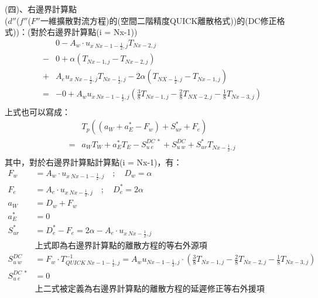 \documentclass[12pt]{article}
\begin{document}
\noindent (四)、右邊界計算點\\

\noindent ($d''$($f''$($F''$一維擴散對流方程)的(空間二階精度QUICK離散格式))的(DC修正格式))：(對於右邊界計算點(i = Nx-1))\\
\begin{equation}\begin{split}
    &0 - A_{w}\cdot u_{x\ Nx-1-\frac{1}{2},j}T_{Nx-2,j}\\
    -&0 + \alpha (T_{Nx-1,j} - T_{Nx-2,j})\\ 
    +&A_{e}u_{x\ Nx-\frac{1}{2},j}T_{Nx-\frac{1}{2},j}  - 2\alpha(T_{NX-\frac{1}{2},j} - T_{Nx-1,j})\\
    =& -0 + A_{w}u_{x\ Nx-1-\frac{1}{2},j}(\frac{3}{8}T_{Nx-1,j}- \frac{2}{8}T_{NX-2,j} - \frac{1}{8}T_{Nx-3,j})\\
    \end{split}
\end{equation}
\noindent 上式也可以寫成：\\
\begin{equation}
\begin{split}
        &T_{p}((a_{W}+a_{E}^{*}-F_{w}) + S_{ur}^{*} + F_{e})\\
        =&a_{W}T_{W} + a_{E}^{*}T_{E} - S_{u\ e}^{DC\ *} + S_{u\ w}^{DC} + S_{ur}^{*}T_{Nx-\frac{1}{2},j}\\
\end{split}
\end{equation}
\noindent 其中，對於右邊界計算點計算點(i = Nx-1)，有：\\
\begin{equation}
    \begin{split}
        F_{w} &= A_{w}\cdot u_{x\ Nx-1-\frac{1}{2},j}\quad;\quad D_{w} = \alpha \\
        F_{e} &= A_{e}\cdot u_{x\ Nx-\frac{1}{2},j} \quad;\quad D_{e}^{*} = 2\alpha \\
        a_{W} &= D_{w}+F_{w} \\
        a_{E}^{*} &= 0 \\
        S_{ur}^{*} &= D_{e}^{*} - F_{e} = 2\alpha - A_{e}\cdot u_{x\ Nx-\frac{1}{2},j}\\
        &\mbox{上式即為右邊界計算點的離散方程的等右外源項}\\
        S_{u\ w}^{DC} &= F_{w}\cdot T_{QUICK\ Nx-1-\frac{1}{2},j}^{-1} = A_{w}u_{Nx-1-\frac{1}{2},j}\cdot (\frac{3}{8}T_{Nx-1,j} - \frac{2}{8}T_{Nx-2,j} - \frac{1}{8}T_{Nx-3,j})\\
        S_{u\ e}^{DC\ *} &= 0 \\
        &\mbox{上二式被定義為右邊界計算點的離散方程的延遲修正等右外援項}\\
    \end{split}
\end{equation}
\end{document}
